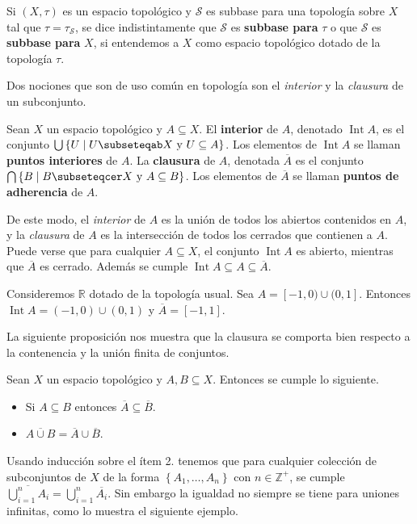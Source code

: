 \begin{Obs}
   Si $(X,\tau)$ es un espacio topológico y $\mathcal{S}$ es subbase para una topología sobre $X$ tal que $\tau=\tau_\mathcal{S}$, se dice indistintamente que $\mathcal{S}$ es \textbf{subbase para} $\tau$ o que $\mathcal{S}$ es \textbf{subbase para} $X$, si entendemos a $X$ como espacio topológico dotado de la topología $\tau$.
\end{Obs}
Dos nociones que son de uso común en topología son el \textit{interior} y la \textit{clausura} de un subconjunto.
\begin{Def}\label{Def:Int_Cl}
   Sean $X$ un espacio topológico y $A\subseteq X$. El \textbf{interior} de $A$, denotado $\operatorname{Int} A$, es el conjunto $\bigcup \left\lbrace U\mid U\subseteqab X \text{ y } U\subseteq A \right\rbrace$. Los elementos de $\operatorname{Int}A$ se llaman \textbf{puntos interiores} de $A$. La \textbf{clausura} de $A$, denotada $\overline{A}$ es el conjunto \\$\bigcap \left\lbrace B \mid B\subseteqcer X \text{ y } A\subseteq B\right\rbrace$. Los elementos de $\overline{A}$ se llaman \textbf{puntos de adherencia} de $A$.
\end{Def}
De este modo, el \textit{interior} de $A$ es la unión de todos los abiertos contenidos en $A$, y la \textit{clausura} de $A$ es la intersección de todos los cerrados que contienen a $A$. Puede verse que para cualquier $A\subseteq X$, el conjunto $\operatorname{Int}A$ es abierto, mientras que $\overline{A}$ es cerrado. Además se cumple $\operatorname{Int} A\subseteq A\subseteq \overline{A}$. 
\begin{Ejm}
   Consideremos $\mathbb{R}$ dotado de la topología usual. Sea $A=[-1,0)\cup(0,1]$. Entonces $\operatorname{Int}A=(-1,0)\cup (0,1)$ y $\overline{A}=[-1,1]$. 
\end{Ejm}
La siguiente proposición nos muestra que la clausura se comporta bien respecto a la contenencia y la unión finita de conjuntos.
\begin{Prop}
   Sean $X$ un espacio topológico y $A,B\subseteq X$. Entonces se cumple lo siguiente.
   \begin{itemize}
      \item[1.] Si $A\subseteq B$ entonces $\overline{A}\subseteq\overline{B}$.
      \item[2.] $\overline{A\cup B}=\overline{A}\cup\overline{B}$.
   \end{itemize}
\end{Prop}
Usando inducción sobre el ítem 2. tenemos que para cualquier colección de subconjuntos de $X$ de la forma $\left\lbrace A_1,\dots,A_n\right\rbrace$ con $n\in\mathbb{Z}^+$, se cumple $\overline{\bigcup_{i=1}^{n}A_i}=\bigcup_{i=1}^{n}\overline{A_i}$. Sin embargo la igualdad no siempre se tiene para uniones infinitas, como lo muestra el siguiente ejemplo.

